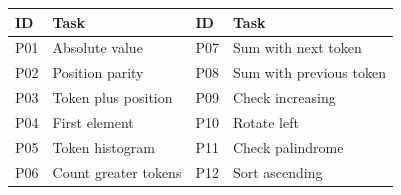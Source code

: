 \begin{center}\small
\begin{tabularx}{\linewidth}{@{}lXlX@{}}
\toprule
ID & Task & ID & Task \\
\midrule
P01 & Absolute value & P07 & Sum with next token \\
P02 & Position parity & P08 & Sum with previous token \\
P03 & Token plus position & P09 & Check increasing \\
P04 & First element & P10 & Rotate left \\
P05 & Token histogram & P11 & Check palindrome \\
P06 & Count greater tokens & P12 & Sort ascending \\
\bottomrule
\end{tabularx}
\end{center}
